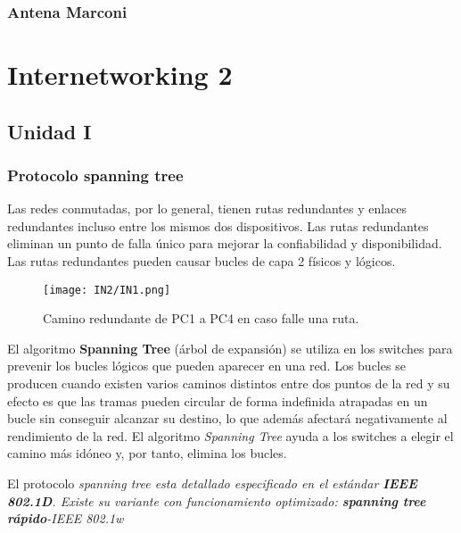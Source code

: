 \documentclass[
	12pt, %
	fleqn, %
	a4paper, %
	oneside, %
]{LegrandOrangeBook}
\begin{document}
\section{Antena Marconi}
\part{Internetworking 2}

\chapter{Unidad I}
\section{Protocolo spanning tree}
Las redes conmutadas, por lo general, tienen rutas  redundantes y enlaces redundantes incluso entre los  mismos dos dispositivos. Las rutas redundantes eliminan un punto de falla único  para mejorar la confiabilidad y disponibilidad. Las rutas redundantes pueden causar bucles de capa 2  físicos y lógicos.
\begin{figure}[H]
\centering
\texttt{[image: IN2/IN1.png]}
\caption{Camino redundante de PC1 a PC4 en caso falle una ruta.}
\end{figure}
El algoritmo \textbf{Spanning Tree} (árbol de expansión) se utiliza en los switches para prevenir los bucles lógicos que pueden aparecer en una red. Los bucles se producen cuando existen varios caminos distintos entre dos puntos de la red y su efecto es que las tramas pueden circular de forma indefinida atrapadas en un bucle sin conseguir alcanzar su destino, lo que además afectará negativamente al rendimiento de la red. El algoritmo \textit{Spanning Tree} ayuda a los switches a elegir el camino más idóneo y, por tanto, elimina los bucles.
\begin{notation}
El protocolo \textit{spanning tree esta detallado especificado en el estándar \textbf{IEEE 802.1D}. Existe su variante con funcionamiento optimizado: \textbf{spanning tree rápido}-IEEE 802.1w}
\end{notation}
\end{document}
